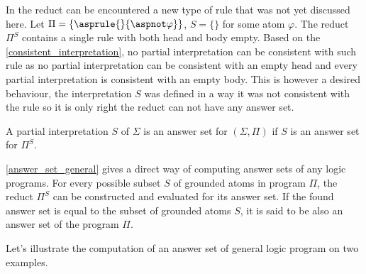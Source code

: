 \begin{example}
    In the reduct can be encountered a new type of rule that was not yet discussed here.
    Let $\Pi = \{\asprule{}{\aspnot \varphi}\}$, $S = \{\}$ for some atom $\varphi$.
    The reduct $\Pi^S$ contains
    a single rule with both head and body empty.
    Based on the \cref{consistent_interpretation},
    no partial interpretation can be consistent
    with such rule as no partial interpretation can be consistent with an empty head
    and every partial interpretation is consistent with an empty body.
    This is however a desired behaviour, the interpretation $S$ was defined
    in a way it was not consistent with the rule so it is only right
    the reduct can not have any answer set.
\end{example}

\begin{definition}%
    \label{answer_set_general}
    A partial interpretation $S$ of $\Sigma$ is an answer set for $(\Sigma, \Pi)$
    if $S$ is an answer set for $\Pi^S$.
\end{definition}

\cref{answer_set_general} gives a direct way of computing answer sets
of any logic programs. For every possible subset $S$ of grounded atoms in program $\Pi$,
the reduct $\Pi^S$ can be constructed and evaluated for its answer set.
If the found answer set is equal to the subset of grounded atoms $S$, it is said
to be also an answer set of the program $\Pi$.

Let's illustrate the computation of an answer set of general logic program on two examples.

